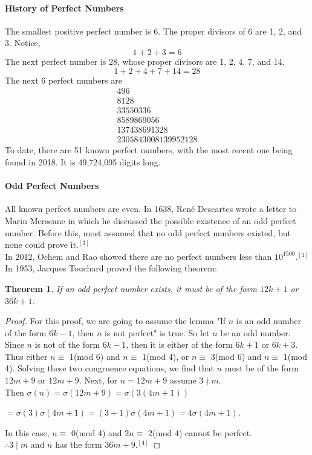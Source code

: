 \documentclass[12pt]{article}
\newtheorem{theorem}{Theorem}
\begin{document}
\paragraph*{History of Perfect Numbers}
The smallest positive perfect number is 6. The proper divisors of 6 are 1, 2, and 3. Notice, $$1+2+3=6$$
The next perfect number is 28, whose proper divisors are 1, 2, 4, 7, and 14.
$$1+2+4+7+14=28$$
The next 6 perfect numbers are
 $$\begin{array}{r}
496\\
8128\\
33550336\\
8589869056\\
137438691328\\
2305843008139952128
\end{array}$$
To date, there are 51 known perfect numbers, with the most recent one being found in 2018. It is 49,724,095 digits long.
\paragraph*{Odd Perfect Numbers}
All known perfect numbers are even. In 1638, René Descartes wrote a letter to Marin Mersenne in which he discussed the possible existence of an odd perfect number. Before this, most assumed that no odd perfect numbers existed, but none could prove it.$^{[3]}$ \\
In 2012, Ochem and Rao showed there are no perfect numbers less than $10^{1500}$.$^{[1]}$ \\
In 1953, Jacques Touchard proved the following theorem:
\begin{theorem}
If an odd perfect number exists, it must be of the form $12k+1$ or $36k+1$. 
\end{theorem} 
\begin{proof}
For this proof, we are going to assume the lemma "If $n$ is an odd number of the form $6k-1$, then $n$ is not perfect" is true.  So let $n$ be an odd number. Since $n$ is not of the form $6k-1$, then it is either of the form $6k+1$ or $6k+3$. Thus either $n \equiv$ 1(mod 6) and $n \equiv$ 1(mod 4), or $n \equiv$ 3(mod 6) and $n \equiv$ 1(mod 4). Solving these two congruence equations, we find that $n$ must be of the form $12m+9$ or $12m+9$. Next, for $n=12m+9$ assume $3 \nmid m$. \\
Then $\sigma (n) = \sigma (12m+9) = \sigma (3(4m+1))$ 
\begin{flushright}
$=\sigma (3) \sigma (4m+1) =(3+1) \sigma (4m+1) = 4\sigma(4m+1)$. 
\end{flushright}
In this case, $n \equiv$ 0(mod 4) and $2n \equiv$ 2(mod 4) cannot be perfect. \\
$\therefore 3 \mid m$ and $n$ has the form $36m+9$.$^{[4]}$
\end{proof} 
\end{document}
